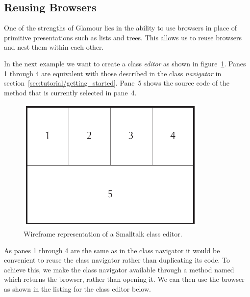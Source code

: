 \documentclass[a4paper,10pt,twoside]{book}
\begin{document}
\subsection{Reusing Browsers}
\label{sec:tutorial/reusing-browsers}

One of the strengths of Glamour lies in the ability to use browsers in
place of primitive presentations such as lists and trees. This allows
us to reuse browsers and nest them within each other.

In the next example we want to create a class \emph{editor} as shown
in figure~\ref{fig:classbrowser_wireframe}. Panes 1 through 4 are
equivalent with those described in the class \emph{navigator} in
section~\ref{sec:tutorial/getting_started}. Pane~5 shows the source
code of the method that is currently selected in pane~4.

\begin{figure}[htbp]
\centerline{\includegraphics[width=\linewidth]{classbrowser_wireframe.pdf}}
\caption{Wireframe representation of a Smalltalk class editor.}
\label{fig:classbrowser_wireframe}
\end{figure}

As panes 1 through 4 are the same as in the class navigator it would
be convenient to reuse the class navigator rather than duplicating its
code. To achieve this, we make the class navigator available through a
method named  which returns the browser, rather than
opening it. We can then use the browser as shown in the listing for
the class editor below.

\end{document}
